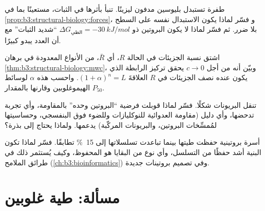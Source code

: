 \begin{exercise}[$\star\star$]\label{exo:b3:structural-biology:9}
طفرة تستبدل بليوسين مدفون ليزينًا. تنبأ بأثرها
في الثبات، مستعينًا بما في \cref{prop:b3:structural-biology:forces}، و
فسّر لماذا يكون الاستبدال نفسه على السطح بلا ضرر.
ثم فسّر لماذا لا يكون البروتين ذو $\Delta G_{\text{الطي}} =
\qty{-30}{kJ/mol}$ ``شديد الثبات'' مع أن العدد يبدو
كبيرًا.
\end{exercise}

\begin{exercise}[$\star\star\star$]\label{exo:b3:structural-biology:10}
اشتق نسبة الجزيئات في الحالة $R$، أي $\bar R$، من
الأنواع المعدودة في برهان \cref{thm:b3:structural-biology:mwc}،
وبيّن أنه من أجل $c \to 0$ يحقق تركيز الرابطة الذي يكون عنده نصف
الجزيئات في $R$ العلاقةَ $(1+\alpha)^{n} = L$. واحسب هذه
$\alpha$ لوسائط الهيموغلوبين وقارنها بالمقدار $P_{50}$.
\end{exercise}

\begin{exercise}[$\star\star\star$]\label{exo:b3:structural-biology:11}
تنقل البريونات شكلًا. فسّر لماذا قوبلت فرضية ``البروتين وحده''
بالمقاومة، وأي تجربة تدحضها، وأي دليل
(مقاومة العدوائية للنوكليازات وللضوء فوق البنفسجي،
وحساسيتها لمُمسِّخات البروتين، والبريونات المركّبة) يدعمها. ولماذا
يحتاج  إلى بذرة؟
\end{exercise}

\begin{exercise}[$\star\star\star$]\label{exo:b3:structural-biology:12}
أسرة بروتينية حفظت طيتها بينما تباعدت تسلسلاتها
إلى \qty{15}{\%} تطابقًا. فسّر لماذا تكون البنية أشد حفظًا من
التسلسل، وأي نوع من البقايا هو المحفوظ، وكيف يُستثمر ذلك
في طرائق الملامح (\cref{ch:b3:bioinformatics}) وفي
تصميم بروتينات جديدة.
\end{exercise}

\section{مسألة: طية غلوبين}

